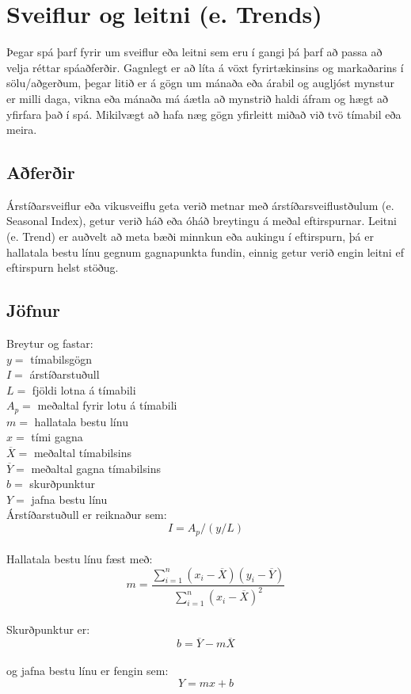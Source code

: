 \section {Sveiflur og leitni (e. Trends)}

Þegar spá þarf fyrir um sveiflur eða leitni \cite{WhatIsTrendForecasting} sem eru í gangi þá þarf að passa að velja réttar spáaðferðir. Gagnlegt er að líta á vöxt fyrirtækinsins og markaðarins í sölu/aðgerðum, þegar litið er á gögn um mánaða eða árabil og augljóst mynstur er milli daga, vikna eða mánaða má áætla að mynstrið haldi áfram og hægt að yfirfara það í spá. Mikilvægt að hafa næg gögn yfirleitt miðað við tvö tímabil eða meira.

\subsection{Aðferðir}
Árstíðarsveiflur eða vikusveiflu geta verið metnar með árstíðarsveiflustðulum (e. Seasonal Index), getur verið háð eða óháð breytingu á meðal eftirspurnar. Leitni (e. Trend) \cite{TrendLine} er auðvelt að meta bæði minnkun eða aukingu í eftirspurn, þá er hallatala bestu línu gegnum gagnapunkta fundin, einnig getur verið engin leitni ef eftirspurn helst stöðug.


\subsection{Jöfnur}

Breytur og fastar:\\
	$y=$ tímabilsgögn \\
	$I=$ árstíðarstuðull \\
	$L=$ fjöldi lotna á tímabili \\
	$A_p=$ meðaltal fyrir lotu á tímabili \\
	$m=$ hallatala bestu línu \\
	$x=$ tími gagna \\
	$\overline{X} = $ meðaltal tímabilsins \\
	$\overline{Y}= $ meðaltal gagna tímabilsins \\
	$ b= $ skurðpunktur \\
	$ Y= $ jafna bestu línu \\

\noindent Árstíðarstuðull er reiknaður sem:
	$$ I=  A_p/(y/L) $$ \\

\noindent Hallatala bestu línu fæst með:
	$$ m= \frac{\sum_{i=1}^{n} (x_{i}-\overline{X})(y_{i}-\overline{Y})}{\sum_{i=1}^{n} (x_{i}-\overline{X})^{2}} $$ \\

\noindent Skurðpunktur er:
	$$ b=  \overline {Y} -m\overline{X} $$ \\

\noindent og jafna bestu línu er fengin sem:
	$$ Y=  mx+b $$ \\